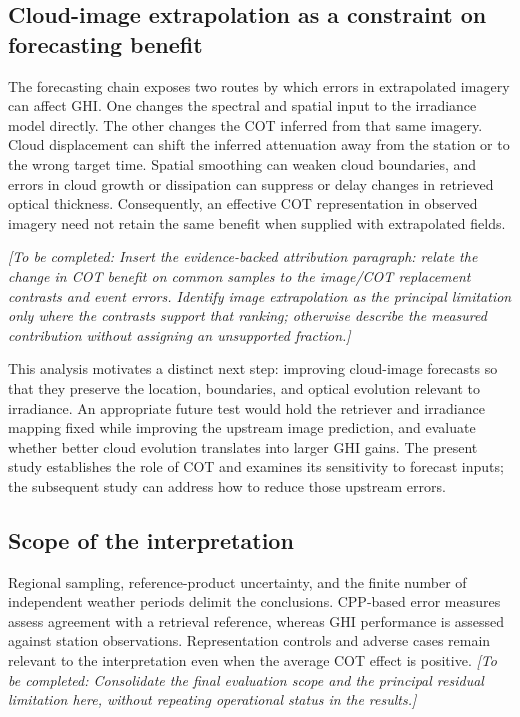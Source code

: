 \documentclass[11pt]{article}
\newcommand{\pending}[1]{\textit{[To be completed: #1]}}
\begin{document}
\subsection{Cloud-image extrapolation as a constraint on forecasting benefit}
The forecasting chain exposes two routes by which errors in extrapolated imagery can affect GHI. One changes the spectral and spatial input to the irradiance model directly. The other changes the COT inferred from that same imagery. Cloud displacement can shift the inferred attenuation away from the station or to the wrong target time. Spatial smoothing can weaken cloud boundaries, and errors in cloud growth or dissipation can suppress or delay changes in retrieved optical thickness. Consequently, an effective COT representation in observed imagery need not retain the same benefit when supplied with extrapolated fields.

\pending{Insert the evidence-backed attribution paragraph: relate the change in COT benefit on common samples to the image/COT replacement contrasts and event errors. Identify image extrapolation as the principal limitation only where the contrasts support that ranking; otherwise describe the measured contribution without assigning an unsupported fraction.}

This analysis motivates a distinct next step: improving cloud-image forecasts so that they preserve the location, boundaries, and optical evolution relevant to irradiance. An appropriate future test would hold the retriever and irradiance mapping fixed while improving the upstream image prediction, and evaluate whether better cloud evolution translates into larger GHI gains. The present study establishes the role of COT and examines its sensitivity to forecast inputs; the subsequent study can address how to reduce those upstream errors.

\subsection{Scope of the interpretation}
Regional sampling, reference-product uncertainty, and the finite number of independent weather periods delimit the conclusions. CPP-based error measures assess agreement with a retrieval reference, whereas GHI performance is assessed against station observations. Representation controls and adverse cases remain relevant to the interpretation even when the average COT effect is positive. \pending{Consolidate the final evaluation scope and the principal residual limitation here, without repeating operational status in the results.}
\end{document}
